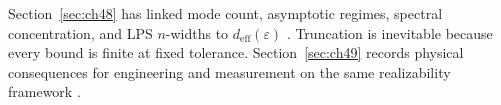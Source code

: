 
Section~\ref{sec:ch48} has linked mode count, asymptotic regimes, spectral concentration, and LPS \(n\)-widths to \(d_{\mathrm{eff}}(\varepsilon)\)
\cite{stratton1941,hansen1988,harrington2001,jackson1999,devaney2004}. Truncation is inevitable because every bound is finite at fixed tolerance.
Section~\ref{sec:ch49} records physical consequences for engineering and measurement on the same realizability framework \cite{stratton1941,harrington2001}.

